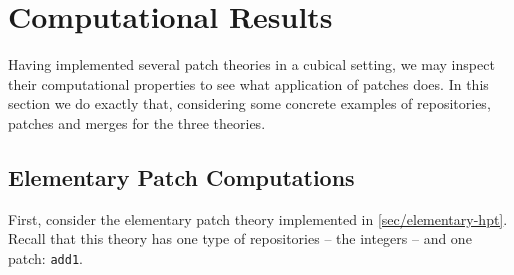 \section{Computational Results}\label{sec:results}

Having implemented several patch theories in a cubical setting, we may inspect
their computational properties to see what application of patches does.
In this section we do exactly that, considering some concrete examples of repositories,
patches and merges for the three theories.

\subsection{Elementary Patch Computations}\label{subsec:elementary-results}

First, consider the elementary patch theory implemented in \autoref{sec/elementary-hpt}.
Recall that this theory has one type of repositories -- the integers -- and one patch:
\texttt{add1}.

